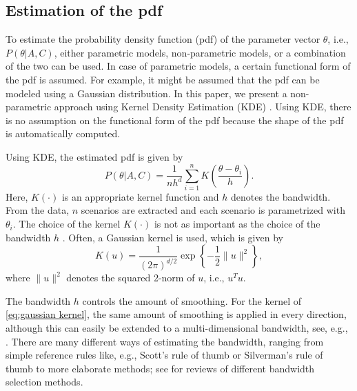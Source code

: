 \subsection{Estimation of the pdf}
\label{sec:pdf}

To estimate the probability density function (pdf) of the parameter vector $\theta$, i.e., $P(\theta|A,C)$, either parametric models, non-parametric models, or a combination of the two can be used. In case of parametric models, a certain functional form of the pdf is assumed. For example, it might be assumed that the pdf can be modeled using a Gaussian distribution. In this paper, we present a non-parametric approach using Kernel Density Estimation (KDE) \cite{rosenblatt1956remarks, parzen1962estimation}. Using KDE, there is no assumption on the functional form of the pdf because the shape of the pdf is automatically computed.

Using KDE, the estimated pdf is given by
\begin{equation}
	\label{eq:kde}
	P(\theta|A,C) = \frac{1}{nh^d} \sum_{i=1}^n K\left(\frac{\theta - \theta_i}{h}\right).
\end{equation}
Here, $K(\cdot)$ is an appropriate kernel function and $h$ denotes the bandwidth. From the data, $n$ scenarios are extracted and each scenario is parametrized with $\theta_i$. The choice of the kernel $K(\cdot)$ is not as important as the choice of the bandwidth $h$ \cite{turlach1993bandwidthselection}. Often, a Gaussian kernel is used, which is given by
\begin{equation}
	\label{eq:gaussian kernel}
	K(u) = \frac{1}{\left( 2\pi \right)^{d/2}} \exp \left\{ -\frac{1}{2} \|u\|^2 \right\},
\end{equation}
where $\|u\|^2$ denotes the squared 2-norm of $u$, i.e., $u^T u$.

The bandwidth $h$ controls the amount of smoothing. For the kernel of \cref{eq:gaussian kernel}, the same amount of smoothing is applied in every direction, although this can easily be extended to a multi-dimensional bandwidth, see, e.g., \cite{scott2005multidimensional, chen2017tutorial}. There are many different ways of estimating the bandwidth, ranging from simple reference rules like, e.g., Scott's rule of thumb \cite{scott2015multivariate} or Silverman's rule of thumb \cite{silverman1986density} to more elaborate methods; see \cite{turlach1993bandwidthselection, bashtannyk2001bandwidth, jones1996brief, chiu1996comparative} for reviews of different bandwidth selection methods. 



